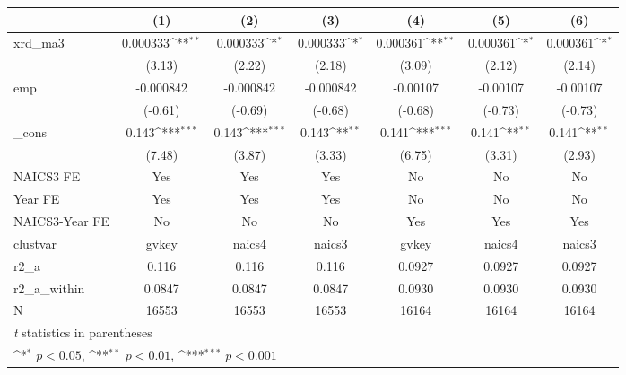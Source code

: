 {
\def\sym#1{\ifmmode^{#1}\else\(^{#1}\)\fi}
\begin{tabular}{l*{6}{c}}
\hline\hline
            &\multicolumn{1}{c}{(1)}         &\multicolumn{1}{c}{(2)}         &\multicolumn{1}{c}{(3)}         &\multicolumn{1}{c}{(4)}         &\multicolumn{1}{c}{(5)}         &\multicolumn{1}{c}{(6)}         \\
\hline
xrd\_ma3     &    0.000333\sym{**} &    0.000333\sym{*}  &    0.000333\sym{*}  &    0.000361\sym{**} &    0.000361\sym{*}  &    0.000361\sym{*}  \\
            &      (3.13)         &      (2.22)         &      (2.18)         &      (3.09)         &      (2.12)         &      (2.14)         \\
[1em]
emp         &   -0.000842         &   -0.000842         &   -0.000842         &    -0.00107         &    -0.00107         &    -0.00107         \\
            &     (-0.61)         &     (-0.69)         &     (-0.68)         &     (-0.68)         &     (-0.73)         &     (-0.73)         \\
[1em]
\_cons      &       0.143\sym{***}&       0.143\sym{***}&       0.143\sym{**} &       0.141\sym{***}&       0.141\sym{**} &       0.141\sym{**} \\
            &      (7.48)         &      (3.87)         &      (3.33)         &      (6.75)         &      (3.31)         &      (2.93)         \\
[1em]
NAICS3 FE   &         Yes         &         Yes         &         Yes         &          No         &          No         &          No         \\
[1em]
Year FE     &         Yes         &         Yes         &         Yes         &          No         &          No         &          No         \\
[1em]
NAICS3-Year FE&          No         &          No         &          No         &         Yes         &         Yes         &         Yes         \\
\hline
clustvar    &       gvkey         &      naics4         &      naics3         &       gvkey         &      naics4         &      naics3         \\
r2\_a        &       0.116         &       0.116         &       0.116         &      0.0927         &      0.0927         &      0.0927         \\
r2\_a\_within &      0.0847         &      0.0847         &      0.0847         &      0.0930         &      0.0930         &      0.0930         \\
N           &       16553         &       16553         &       16553         &       16164         &       16164         &       16164         \\
\hline\hline
\multicolumn{7}{l}{\footnotesize \textit{t} statistics in parentheses}\\
\multicolumn{7}{l}{\footnotesize \sym{*} \(p<0.05\), \sym{**} \(p<0.01\), \sym{***} \(p<0.001\)}\\
\end{tabular}
}
